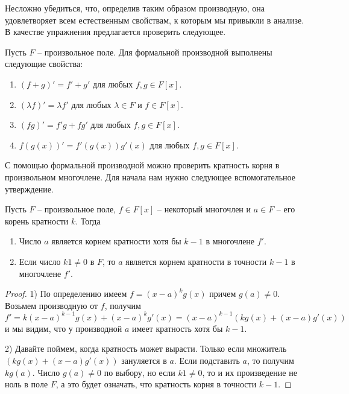 Несложно убедиться, что, определив таким образом производную, она удовлетворяет всем естественным свойствам, к которым мы привыкли в анализе.
В качестве упражнения предлагается проверить следующее.

\begin{claim}
Пусть $F$ -- произвольное поле.
Для формальной производной выполнены следующие свойства:
\begin{enumerate}
\item $(f + g)' = f' + g'$ для любых $f,g\in F[x]$.

\item $(\lambda f )' = \lambda f'$ для любых $\lambda\in F$ и $f\in F[x]$.

\item $(fg)' = f' g + fg'$ для любых $f,g\in F[x]$.

\item $f(g(x))' = f'(g(x)) g'(x)$ для любых $f,g\in F[x]$.
\end{enumerate}
\end{claim}


С помощью формальной производной можно проверить кратность корня в произвольном многочлене.
Для начала нам нужно следующее вспомогательное утверждение.

\begin{claim}
Пусть $F$ -- произвольное поле, $f\in F[x]$ -- некоторый многочлен и $a\in F$ -- его корень кратности $k$.
Тогда 
\begin{enumerate}
\item Число $a$ является корнем кратности хотя бы $k-1$ в многочлене $f'$.

\item Если число $k 1 \neq 0$ в $F$, то $a$ является корнем кратности в точности $k - 1$ в многочлене $f'$.
\end{enumerate}
\end{claim}
\begin{proof}
1) По определению имеем $f = (x - a)^k g(x)$ причем $g(a) \neq 0$.
Возьмем производную от $f$, получим
\[
f' = k(x-a)^{k-1}g(x) + (x-a)^k g'(x) = (x-a)^{k-1}(kg(x) + (x-a)g'(x))
\]
и мы видим, что у производной $a$ имеет кратность хотя бы $k-1$.


2) Давайте поймем, когда кратность может вырасти.
Только если множитель $(kg(x) + (x-a)g'(x))$ зануляется в $a$.
Если подставить $a$, то получим $kg(a)$.
Число $g(a)\neq 0$ по выбору, но если $k 1\neq 0$, то и их произведение не ноль в поле $F$, а это будет означать, что кратность корня в точности $k - 1$.
\end{proof}

